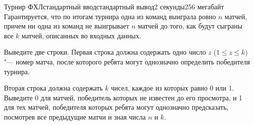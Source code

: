 \begin{problem}{Турнир ФХЛ}{стандартный ввод}{стандартный вывод}{2 секунды}{256 мегабайт}
Гарантируется, что по итогам турнира одна из команд выиграла ровно $n$ матчей, причем
ни одна из команд не выигрывает $n$ матчей до того, как будут
сыграны все $k$ матчей, описанных во входных данных.

\OutputFile
Выведите две строки. Первая строка должна содержать одно число $z$ ($1 \le z \le k$) "--- номер
матча, после которого ребята могут однозначно определить победителя турнира.

Вторая строка должна содержать $k$ чисел, каждое из которых равно 0 или 1. Выведите 0 для
матчей, победитель которых не известен до его просмотра, и 1 для тех матчей, победителя которых
ребята могут однозначно предсказать, посмотрев все предыдущие матчи и зная числа $n$ и $k$.

\Example

\begin{example}%
%
\end{example}


\end{problem}
